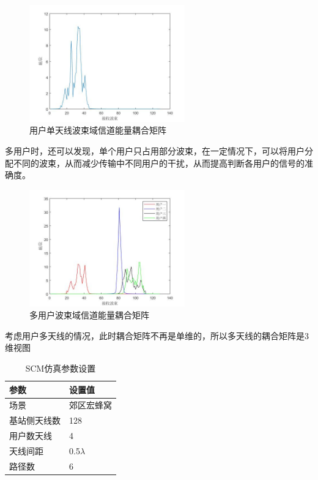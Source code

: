 \documentclass[bachelor,nocolorlinks, printoneside]{seuthesis} %
\begin{document}
\begin{Main}
\begin{figure}[htbp!]
	\centering \includegraphics[width=0.6\textwidth]{img/2_2.jpg} \caption{用户单天线波束域信道能量耦合矩阵}
\end{figure}
多用户时，还可以发现，单个用户只占用部分波束，在一定情况下，可以将用户分配不同的波束，从而减少传输中不同用户的干扰，从而提高判断各用户的信号的准确度。
\begin{figure}[htbp!]
	\centering \includegraphics[width=0.6\textwidth]{img/2_5.jpg} \caption{多用户波束域信道能量耦合矩阵}
\end{figure}
考虑用户多天线的情况，此时耦合矩阵不再是单维的，所以多天线的耦合矩阵是3维视图
\begin{table}[htbp]
	\centering
	\caption{\label{tab:test}SCM仿真参数设置}
	\begin{tabular}{ll}
		\toprule
		参数 &  设置值 \\
		\bottomrule
		场景 &  郊区宏蜂窝 \\
		\bottomrule
		基站侧天线数 & 128 \\
		\bottomrule
		用户数天线	& 4 \\
		\bottomrule
		天线间距 & 0.5$\lambda$ \\
		\bottomrule
		路径数 & 6 \\
		\bottomrule
	\end{tabular}
\end{table}


\end{Main}
\end{document}
